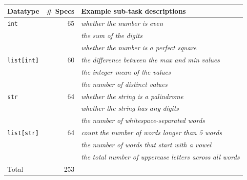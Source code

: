 \begin{tabular}{lrp{.67\linewidth}}\toprule
Datatype & \# Specs & Example sub-task descriptions\\\midrule
\texttt{int} & 65 & \textit{whether the number is even}\\
 &  & \textit{the sum of the digits}\\
 &  & \textit{whether the number is a perfect square}\\
\addlinespace
\texttt{list[int]} & 60 & \textit{the difference between the max and min values}\\
 &  & \textit{the integer mean of the values}\\
 &  & \textit{the number of distinct values}\\
\addlinespace
\texttt{str} & 64 & \textit{whether the string is a palindrome}\\
 &  & \textit{whether the string has any digits}\\
 &  & \textit{the number of whitespace-separated words}\\
\addlinespace
\texttt{list[str]} & 64 & \textit{count the number of words longer than 5 words}\\
 &  & \textit{the number of words that start with a vowel}\\
 &  & \textit{the total number of uppercase letters across all words}\\
\midrule Total & 253 & \\\bottomrule\end{tabular}
